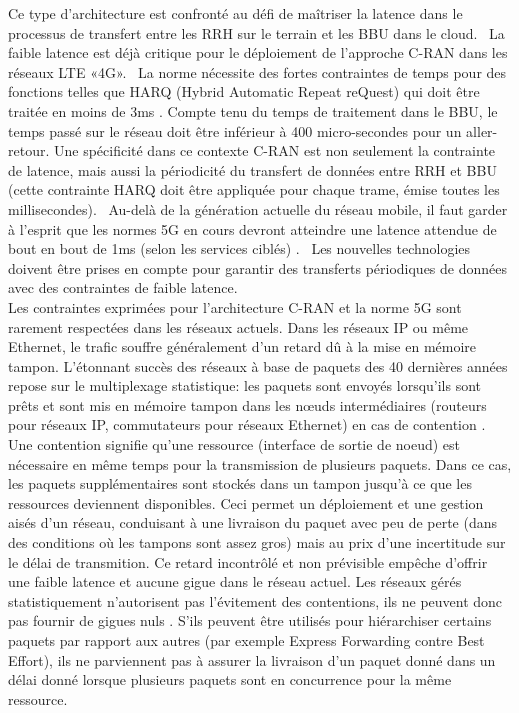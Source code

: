 \documentclass{article}
\begin{document}
Ce type d'architecture est confronté au défi de maîtriser la latence dans le processus de transfert entre les RRH sur le terrain et les BBU dans le cloud.
 La faible latence est déjà critique pour le déploiement de l'approche C-RAN dans les réseaux LTE «4G».
 La norme nécessite des fortes contraintes de temps pour des fonctions telles que HARQ (Hybrid Automatic Repeat reQuest) qui doit être traitée en moins de 3ms \cite{bouguen2012lte}. Compte tenu du temps de traitement dans le BBU, le temps passé sur le réseau doit être inférieur à 400 micro-secondes pour un aller-retour. Une spécificité dans ce contexte C-RAN est non seulement la contrainte de latence, mais aussi la périodicité du transfert de données entre RRH et BBU (cette contrainte HARQ doit être appliquée pour chaque trame, émise toutes les millisecondes).
 Au-delà de la génération actuelle du réseau mobile, il faut garder à l'esprit que les normes 5G en cours devront atteindre une latence attendue de bout en bout de 1ms (selon les services ciblés) \cite{boccardi2014five}.
 Les nouvelles technologies doivent être prises en compte pour garantir des transferts périodiques de données avec des contraintes de faible latence. \\

Les contraintes exprimées pour l'architecture C-RAN et la norme 5G sont rarement respectées dans les réseaux actuels. Dans les réseaux IP ou même Ethernet, le trafic souffre généralement d'un retard dû à la mise en mémoire tampon. L'étonnant succès des réseaux à base de paquets des 40 dernières années repose sur le multiplexage statistique: les paquets sont envoyés lorsqu'ils sont prêts et sont mis en mémoire tampon dans les nœuds intermédiaires (routeurs pour réseaux IP, commutateurs pour réseaux Ethernet) en cas de contention \cite{venkatramani1994supporting}. Une contention signifie qu'une ressource (interface de sortie de noeud) est nécessaire en même temps pour la transmission de plusieurs paquets. Dans ce cas, les paquets supplémentaires sont stockés dans un tampon jusqu'à ce que les ressources deviennent disponibles. Ceci permet un déploiement et une gestion aisés d'un réseau, conduisant à une livraison du paquet avec peu de perte (dans des conditions où les tampons sont assez gros) mais au prix d'une incertitude sur le délai de transmition. Ce retard incontrôlé et non prévisible empêche d'offrir une faible latence et aucune gigue dans le réseau actuel.
Les réseaux gérés statistiquement n'autorisent pas l'évitement des contentions, ils ne peuvent donc pas fournir de gigues nuls \cite{khaunte2003technique}. S'ils peuvent être utilisés pour hiérarchiser certains paquets par rapport aux autres (par exemple Express Forwarding contre Best Effort), ils ne parviennent pas à assurer la livraison d'un paquet donné dans un délai donné lorsque plusieurs paquets sont en concurrence pour la même ressource.
\end{document}
